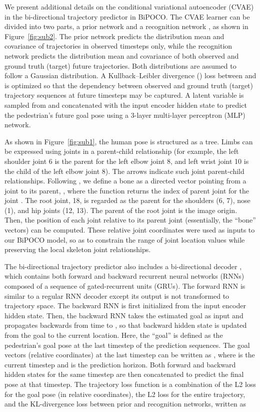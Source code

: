 \documentclass[nohyperref]{article}
\theoremstyle{plain}
\theoremstyle{definition}
\theoremstyle{remark}
\begin{document}
We present additional details on the conditional variational autoencoder (CVAE) in the bi-directional trajectory predictor in BiPOCO. The CVAE learner can be divided into two parts, a prior network and a recognition network \cite{sohn2015learning}, as shown in Figure~\ref{fig:sub2}. The prior network predicts the distribution mean and covariance  of trajectories in observed timesteps only, while the recognition network predicts the distribution mean and covariance  of both observed and ground truth (target) future trajectories. Both distributions are assumed to follow a Gaussian distribution. A Kullback–Leibler divergence () loss between  and  is optimized so that the dependency between observed and ground truth (target) trajectory sequences at future timesteps may be captured.  A latent variable  is sampled from  and concatenated with the input encoder hidden state to predict the pedestrian's future goal pose  using a 3-layer multi-layer perceptron  (MLP) network.


As shown in Figure~\ref{fig:sub1}, the human pose is structured as a tree.  Limbs can be expressed using joints in a parent-child relationship (for example, the left shoulder joint 6 is the parent for the left elbow joint 8, and left wrist joint 10 is the child of the left elbow joint 8). The arrows indicate such joint parent-child relationships. Following \cite{sun2017compositional}, we define a bone as a directed vector pointing from a joint to its parent, , where the function  returns the index of parent joint for the  joint . The root joint, 18, is regarded as the parent for the shoulders (6, 7), nose (1), and hip joints (12, 13). The parent of the root joint is the image origin. Then, the position of each joint relative to its parent joint (essentially, the ``bone'' vectors) can be computed. These relative joint coordinates were used as inputs to our BiPOCO model, so as to constrain the range of joint location values while  preserving the local skeleton joint relationships.


The bi-directional trajectory predictor also includes a bi-directional decoder \cite{yao2021bitrap}, which contains both forward and backward recurrent neural networks (RNNs) composed of a sequence of gated-recurrent units (GRUs). The forward RNN is similar to a regular RNN decoder except its output is not transformed to trajectory space. The backward RNN is first initialized from the input encoder hidden state. Then, the backward RNN takes the estimated goal as input and propagates backwards from time  to , so that backward hidden state is updated from the goal to the current location. Here, the ``goal''  is defined as the pedestrian's goal pose at the last timestep of the prediction sequences. The goal vectors (relative coordinates) at the last timestep can be written as , where  is the current timestep and  is the prediction horizon.
 Both forward and backward hidden states for the same timestep are then concatenated to predict the final pose at that timestep. The trajectory loss function is a combination of the L2 loss  for the goal pose (in relative coordinates), the L2 loss for the entire trajectory, and the KL-divergence loss between
prior and recognition networks, written as   
\end{document}
